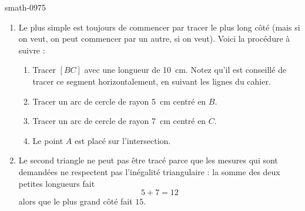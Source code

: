 
\begin{corrige}{smath-0975}

    \begin{enumerate}
        \item
            Le plus simple est toujours de commencer par tracer le plus long côté (mais si on veut, on peut commencer par un autre, si on veut). Voici la procédure à suivre :
            \begin{enumerate}
                \item
                    Tracer \( [BC]\) avec une longueur de \SI{10}{\centi\meter}. Notez qu'il est conseillé de tracer ce segment horizontalement, en suivant les lignes du cahier.
                \item
                    Tracer un arc de cercle de rayon \SI{5}{\centi\meter} centré en \( B\).
                \item
                    Tracer un arc de cercle de rayon \SI{7}{\centi\meter} centré en \( C\).
                \item
                    Le point \( A\) est placé sur l'intersection.
            \end{enumerate}

\begin{center}
   
\end{center}

\item

    Le second triangle ne peut pas être tracé parce que les mesures qui sont demandées ne respectent pas l'inégalité triangulaire : la somme des deux petites longueurs fait
    \begin{equation}
        5+7=12
    \end{equation}
    alors que le plus grand côté fait \( 15\).
    \end{enumerate}

\end{corrige}

